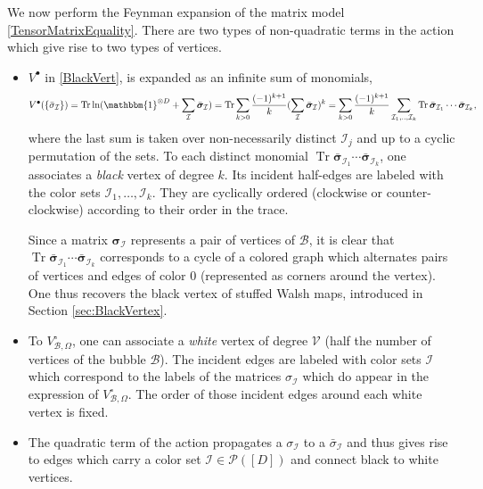 \documentclass[aps,prd,10pt,notitlepage,nofootinbib,superscriptaddress,showkeys,showpacs]{revtex4-1}
\begin{document}
We now perform the Feynman expansion of the matrix model \eqref{TensorMatrixEquality}. There are two types of non-quadratic terms in the action which give rise to two types of vertices. 
\begin{itemize}
\item $V^\bullet$ in \eqref{BlackVert}, is expanded as an infinite sum of monomials,
\begin{equation}
V^\bullet(\{\bar\sigma_{\mathcal{I}}\})
=\operatorname{Tr}\ln({\mathbbm{1}}^{\otimes D}+\sum_{\mathcal{I}}\bar{\bm{\sigma}}_{\mathcal{I}})=\operatorname{Tr}\sum_{k>0}\frac{(-1)^{k+1}}{k}(\sum_{\mathcal{I}}\bar{\bm{\sigma}}_{\mathcal{I}})^k
=\sum_{k>0}\frac{(-1)^{k+1}}{k}\sum_{{\mathcal{I}}_1,..,{\mathcal{I}}_k}\operatorname{Tr}\bar{\bm{\sigma}}_{{\mathcal{I}}_1}\dotsm \bar{\bm{\sigma}}_{{\mathcal{I}}_k},
\end{equation}
where the last sum is taken over non-necessarily distinct ${\mathcal{I}}_j$ and up to a cyclic permutation of the sets. To each distinct monomial $\operatorname{Tr}\bar{\bm{\sigma}}_{{\mathcal{I}}_1}\dotsm \bar{\bm{\sigma}}_{{\mathcal{I}}_k}$, one associates a \emph{black} vertex of degree $k$. Its incident half-edges are labeled with the color sets ${\mathcal{I}}_1,\dotsc, {\mathcal{I}}_k$. They are cyclically ordered (clockwise or counter-clockwise) according to their order in the trace.

Since a matrix ${\bm{\sigma}}_{\mathcal{I}}$ represents a pair of vertices of ${\mathcal{B}}$, it is clear that $\operatorname{Tr}\bar{\bm{\sigma}}_{{\mathcal{I}}_1}\dotsm \bar{\bm{\sigma}}_{{\mathcal{I}}_k}$ corresponds to a cycle of a colored graph which alternates pairs of vertices and edges of color 0 (represented as corners around the vertex). One thus recovers the black vertex of stuffed Walsh maps, introduced in Section \ref{sec:BlackVertex}.

\item To $V^{\circ}_{{\mathcal{B}},\Omega}$, one can associate a \emph{white} vertex of degree ${\mathcal{V}}$ (half the number of vertices of the bubble ${\mathcal{B}}$). The incident edges are labeled with color sets ${\mathcal{I}}$ which correspond to the labels of the matrices $\sigma_{\mathcal{I}}$ which do appear in the expression of $V^\circ_{{\mathcal{B}}, \Omega}$. The order of those incident edges around each white vertex is fixed.

\item The quadratic term of the action propagates a $\sigma_{\mathcal{I}}$ to a $\bar{\sigma}_{\mathcal{I}}$ and thus gives rise to edges which carry a color set ${\mathcal{I}}\in {\mathcal{P}}([D])$ and connect black to white vertices.


\end{itemize}
\end{document}
